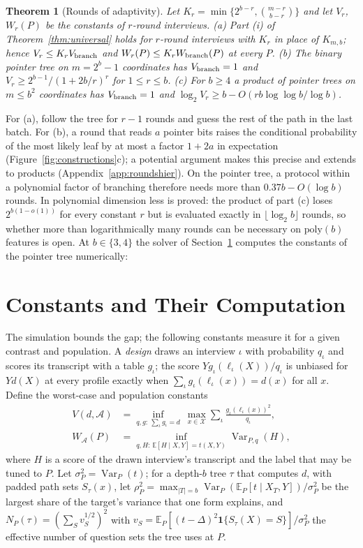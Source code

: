 \documentclass{article}
\newtheorem{theorem}{Theorem}
\newcommand{\E}{\mathbb{E}}
\newcommand{\Var}{\operatorname{Var}}
\newcommand{\X}{\mathcal X}
\newcommand{\A}{\mathcal A}
\begin{document}
\begin{theorem}[Rounds of adaptivity]\label{thm:rounds}
Let $K_r=\min\{2^{b-r},\binom{m-r}{b-r}\}$ and let $V_r$, $W_r(P)$ be the constants of $r$-round interviews.
\textup{(a)} Part \textup{(i)} of Theorem~\ref{thm:universal} holds for $r$-round interviews with $K_r$ in place of $K_{m,b}$; hence $V_r\le K_rV_{\rm branch}$ and $W_r(P)\le K_rW_{\rm branch}(P)$ at every $P$.
\textup{(b)} The binary pointer tree on $m=2^b-1$ coordinates has $V_{\rm branch}=1$ and $V_r\ge2^{b-1}/(1+2b/r)^{r}$ for $1\le r\le b$.
\textup{(c)} For $b\ge4$ a product of pointer trees on $m\le b^2$ coordinates has $V_{\rm branch}=1$ and $\log_2V_r\ge b-O(rb\log\log b/\log b)$.
\end{theorem}
For (a), follow the tree for $r-1$ rounds and guess the rest of the path in the last batch. For (b), a round that reads $a$ pointer bits raises the conditional probability of the most likely leaf by at most a factor $1+2a$ in expectation (Figure~\ref{fig:constructions}c); a potential argument makes this precise and extends to products (Appendix~\ref{app:roundshier}). On the pointer tree, a protocol within a polynomial factor of branching therefore needs more than $0.37b-O(\log b)$ rounds. In polynomial dimension less is proved: the product of part (c) loses $2^{b(1-o(1))}$ for every constant $r$ but is evaluated exactly in $\lfloor\log_2b\rfloor$ rounds, so whether more than logarithmically many rounds can be necessary on $\mathrm{poly}(b)$ features is open. At $b\in\{3,4\}$ the solver of Section~\ref{sec:general} computes the constants of the pointer tree numerically: \nPointerSentence{}

\section{Constants and Their Computation}\label{sec:general}\label{sec:population}
The simulation bounds the gap; the following constants measure it for a given contrast and population. A \emph{design} draws an interview $\iota$ with probability $q_\iota$ and scores its transcript with a table $g_\iota$; the score $Yg_\iota(\ell_\iota(X))/q_\iota$ is unbiased for $Yd(X)$ at every profile exactly when $\sum_\iota g_\iota(\ell_\iota(x))=d(x)$ for all $x$. Define the worst-case and population constants
\begin{align}
 V(d,\A)&=\inf_{q,g:\ \sum_\iota g_\iota=d}\ \max_{x\in\X}\sum_\iota\frac{g_\iota(\ell_\iota(x))^2}{q_\iota},\label{eq:unbiasedprogram}\\
 W_{\A}(P)&=\inf_{q,H:\,\E[H\mid X,Y]=t(X,Y)}\Var_{P,q}(H),\label{eq:mainW}
\end{align}
where $H$ is a score of the drawn interview's transcript and the label that may be tuned to $P$. Let $\sigma_P^2=\Var_P(t)$; for a depth-$b$ tree $\tau$ that computes $d$, with padded path sets $S_\tau(x)$, let $\rho_P^2=\max_{|T|=b}\Var_P(\E_P[t\mid X_T,Y])/\sigma_P^2$ be the largest share of the target's variance that one form explains, and $N_P(\tau)=(\sum_Sv_S^{1/2})^2$ with $v_S=\E_P[(t-\Delta)^2\mathbf 1\{S_\tau(X)=S\}]/\sigma_P^2$ the effective number of question sets the tree uses at $P$.
\end{document}
